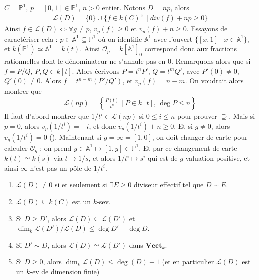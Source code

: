             \begin{expl}
                $C = \mathbb{P}^1$, $p = [0,1] \in \mathbb{P}^1$, $n > 0$ entier. Notons $D = np$, alors 
                \begin{align*}
                    \mathcal{L}(D) = \{0\} \cup \{f \in k(C)^\times \mid div(f) + np \geq 0\}
                \end{align*}
                Ainsi $f \in \mathcal{L}(D) \iff \forall g \neq p,\, v_p(f) \geq 0$ et $v_p(f) + n \geq 0$. Essayons de caractériser cela : $p \in \mathbb{A}^1 \subseteq \mathbb{P}^1$ où on identifie $\mathbb{A}^1$ avec l'ouvert $\{[x,1] \mid x \in \mathbb{A}^1\}$, et $k(\mathbb{P}^1) \simeq \mathbb{A}^1 = k(t)$. Ainsi $\mathcal{O}_p = k[\mathbb{A}^1]_0$ correspond donc aux fractions rationnelles dont le dénominateur ne s'annule pas en $0$. Remarquons alors que si $f = P/Q$, $P,Q \in k[t]$. Alors écrivons $P = t^nP'$, $Q = t^m Q'$, avec $P'(0) \neq 0$, $Q'(0) \neq 0$. Alors $f = t^{n - m}(P'/Q')$, et $v_p(f) = n - m$. On voudrait alors montrer que 
                \begin{align*}
                    \mathcal{L}(np) = \left\{ \frac{P(t)}{t^n} \mid P \in k[t],\, \deg P \leq n \right\}
                \end{align*}
                Il faut d'abord montrer que $1/t^i \in \mathcal{L}(np)$ si $0 \leq i \leq n$ pour prouver $\supseteq$. Mais si $p = 0$, alors $v_p(1/t^i) = -i$, et donc $v_p(1/t^i) + n \geq 0$. Et si $g \neq 0$, alors $v_g(1/t^i) = 0$ (). Maintenant si $g = \infty = [1,0]$, on doit changer de carte pour calculer $\mathcal{O}_g$ : on prend $y \in \mathbb{A}^1 \mapsto [1,y] \in \mathbb{P}^1$. Et par ce changement de carte $k(t) \simeq k(s)$ via $t \mapsto 1/s$, et alors $1/t^i \mapsto s^i$ qui est de $g$-valuation positive, et ainsi $\infty$ n'est pas un pôle de $1/t^i$. 
            \end{expl}
            \begin{prop}
                \begin{enumerate}
                    \item $\mathcal{L}(D) \neq 0$ si et seulement si $\exists E \geq 0$ diviseur effectif tel que $D \sim E$.
                    \item $\mathcal{L}(D) \subseteq k(C)$ est un $k$-sev.
                    \item Si $D \geq D'$, alors $\mathcal{L}(D) \subseteq \mathcal{L}(D')$ et $\dim_k \mathcal{L}(D')/\mathcal{L}(D) \leq \deg D' - \deg D$.
                    \item Si $D' \sim D$, alors $\mathcal{L}(D) \simeq \mathcal{L}(D')$ dans $\mathbf{Vect}_k$.
                    \item Si $D \geq 0$, alors $\dim_k \mathcal{L}(D) \leq \deg(D) + 1$ (et en particulier $\mathcal{L}(D)$ est un $k$-ev de dimension finie)
                \end{enumerate}
            \end{prop}
